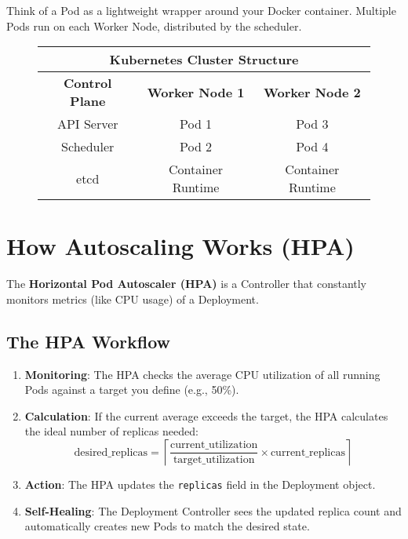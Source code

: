 \documentclass[12pt,a4paper]{article}
\begin{document}
\begin{tipbox}
Think of a Pod as a lightweight wrapper around your Docker container. Multiple Pods run on each Worker Node, distributed by the scheduler.
\end{tipbox}

\begin{figure}[H]
\centering
\begin{tabular}{|c|c|c|}
\hline
\multicolumn{3}{|c|}{\textbf{Kubernetes Cluster Structure}} \\
\hline
\textbf{Control Plane} & \textbf{Worker Node 1} & \textbf{Worker Node 2} \\
\hline
API Server & Pod 1 & Pod 3 \\
Scheduler & Pod 2 & Pod 4 \\
etcd & Container Runtime & Container Runtime \\
\hline
\end{tabular}
\end{figure}

\section{How Autoscaling Works (HPA)}

The \textbf{Horizontal Pod Autoscaler (HPA)} is a Controller that constantly monitors metrics (like CPU usage) of a Deployment.

\subsection{The HPA Workflow}

\begin{enumerate}
    \item \textbf{Monitoring}: The HPA checks the average CPU utilization of all running Pods against a target you define (e.g., 50\%).

    \item \textbf{Calculation}: If the current average exceeds the target, the HPA calculates the ideal number of replicas needed:
    \[
    \text{desired\_replicas} = \left\lceil \frac{\text{current\_utilization}}{\text{target\_utilization}} \times \text{current\_replicas} \right\rceil
    \]

    \item \textbf{Action}: The HPA updates the \texttt{replicas} field in the Deployment object.

    \item \textbf{Self-Healing}: The Deployment Controller sees the updated replica count and automatically creates new Pods to match the desired state.
\end{enumerate}
\end{document}
